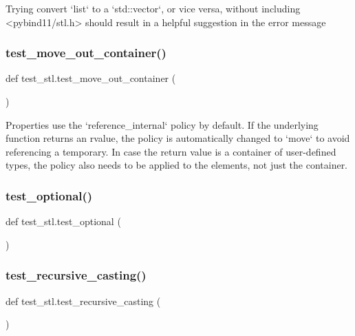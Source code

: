 \begin{DoxyVerb}Trying convert `list` to a `std::vector`, or vice versa, without including
<pybind11/stl.h> should result in a helpful suggestion in the error message\end{DoxyVerb}
 \mbox{\label{namespacetest__stl_a345c03c86a8555ffdf9a4a1f90b7d04c}} 
\subsubsection{\texorpdfstring{test\_move\_out\_container()}{test\_move\_out\_container()}}
{\footnotesize\ttfamily def test\+\_\+stl.\+test\+\_\+move\+\_\+out\+\_\+container (\begin{DoxyParamCaption}{ }\end{DoxyParamCaption})}

\begin{DoxyVerb}Properties use the `reference_internal` policy by default. If the underlying function
returns an rvalue, the policy is automatically changed to `move` to avoid referencing
a temporary. In case the return value is a container of user-defined types, the policy
also needs to be applied to the elements, not just the container.\end{DoxyVerb}
 \mbox{\label{namespacetest__stl_a7293c8c08dec892fef3ff12e769cbc7f}} 
\subsubsection{\texorpdfstring{test\_optional()}{test\_optional()}}
{\footnotesize\ttfamily def test\+\_\+stl.\+test\+\_\+optional (\begin{DoxyParamCaption}{ }\end{DoxyParamCaption})}

\mbox{\label{namespacetest__stl_ae4301c7bbd65df6783d4d0aa685b352d}} 
\subsubsection{\texorpdfstring{test\_recursive\_casting()}{test\_recursive\_casting()}}
{\footnotesize\ttfamily def test\+\_\+stl.\+test\+\_\+recursive\+\_\+casting (\begin{DoxyParamCaption}{ }\end{DoxyParamCaption})}

